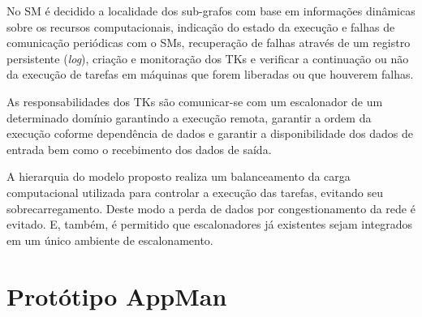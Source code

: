 No SM é decidido a localidade dos sub-grafos com base em informações dinâmicas sobre os recursos computacionais, indicação do estado da execução e falhas de comunicação periódicas com o SMs, recuperação de falhas através de um registro persistente (\emph{log}), criação e monitoração dos TKs e verificar a continuação ou não da execução de tarefas em máquinas que forem liberadas ou que houverem falhas.

As responsabilidades dos TKs são comunicar-se com um escalonador de um determinado domínio garantindo a execução remota, garantir a ordem da execução coforme dependência de dados e garantir a disponibilidade dos dados de entrada bem como o recebimento dos dados de saída.

A hierarquia do modelo proposto realiza um balanceamento da carga computacional utilizada para controlar a execução das tarefas, evitando seu sobrecarregamento. Deste modo a perda de dados por congestionamento da rede é evitado. E, também, é permitido que escalonadores já existentes sejam integrados em um único ambiente de escalonamento.

\section{Protótipo AppMan}